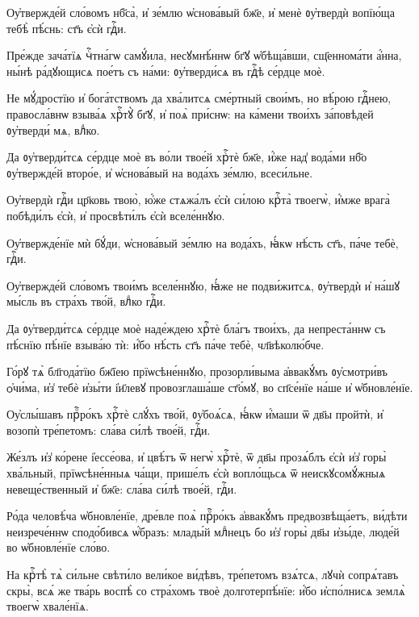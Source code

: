\hKv Оу҆твержде́й сло́вомъ нб҃са̀, и҆ зе́млю ѡ҆снова́вый бж҃е, и҆  менѐ ᲂу҆твердѝ вопїю́ща тебѣ̀ пѣ́снь: ст҃ъ є҆сѝ гдⷭ҇и.  

\hKv Пре́жде зача́тїѧ чⷭ҇тна́гѡ самꙋ́ила, несꙋмнѣ́ннѡ бг҃ꙋ  ѡ҆бѣща́вши, сщ҃еннома́ти а҆́нна, ны́нѣ ра́дꙋющисѧ пое́тъ съ на́ми:  ᲂу҆тверди́сѧ въ гдⷭ҇ѣ се́рдце моѐ. 

\hKv Не мꙋ́дростїю и҆ бога́тствомъ да хва́литсѧ сме́ртный свои́мъ, но  вѣ́рою гдⷭ҇нею, правосла́внѡ взыва́ѧ хрⷭ҇тꙋ̀ бг҃ꙋ, и҆ поѧ̀ при́снѡ:  на ка́мени твои́хъ за́повѣдей ᲂу҆тверди́ мѧ, влⷣко. 
%

\hKv Да ᲂу҆тверди́тсѧ се́рдце моѐ въ во́ли твое́й хрⷭ҇тѐ бж҃е,  и҆́же над̾ вода́ми нб҃о ᲂу҆твержде́й второ́е, и҆ ѡ҆снова́вый на  вода́хъ зе́млю, всеси́льне. 

\hKv Оу҆твердѝ гдⷭ҇и цр҃ковь твою̀, ю҆́же стѧжа́лъ є҆сѝ си́лою  крⷭ҇та̀ твоегѡ̀, и҆́мже врага̀ побѣди́лъ є҆сѝ, и҆ просвѣти́лъ  є҆сѝ вселе́ннꙋю. 

\hKv Оу҆твержде́нїе мѝ бꙋ́ди, ѡ҆снова́вый зе́млю на вода́хъ, ꙗ҆́кѡ  нѣ́сть ст҃ъ, па́че тебѐ, гдⷭ҇и. 

\hKv Оу҆твержде́й сло́вомъ твои́мъ вселе́ннꙋю, ꙗ҆́же не подви́житсѧ,  ᲂу҆твердѝ и҆ на́шꙋ мы́сль въ стра́хъ тво́й, влⷣко гдⷭ҇и.  

\hKv Да ᲂу҆тверди́тсѧ се́рдце моѐ наде́ждею хрⷭ҇тѐ бла́гъ твои́хъ,  да непреста́ннѡ съ пѣ́снїю пѣ́нїе взыва́ю тѝ: и҆́бо нѣ́сть ст҃ъ  па́че тебѐ, чл҃вѣколю́бче. 
%

\hKv Го́рꙋ тѧ̀ бл҃года́тїю бж҃їею прїѡсѣне́ннꙋю, прозорли́выма  а҆ввакꙋ́мъ ᲂу҆смотри́въ ѻ҆чи́ма, и҆з̾ тебѐ и҆зы́ти і҆и҃левꙋ  провозглаша́ше ст҃о́мꙋ, во сп҃се́нїе на́ше и҆ ѡ҆бновле́нїе. 

\hKv Оу҆слы́шавъ прⷪ҇ро́къ хрⷭ҇тѐ слꙋ́хъ тво́й, ᲂу҆боѧ́сѧ, ꙗ҆́кѡ  и҆́маши ѿ дв҃ы пройтѝ, и҆ возопѝ тре́петомъ: сла́ва си́лѣ  твое́й, гдⷭ҇и. 
%

\hKv Же́злъ и҆з̾ ко́рене і҆ессе́ова, и҆  цвѣ́тъ ѿ негѡ̀ хрⷭ҇тѐ, ѿ дв҃ы прозѧ́блъ є҆сѝ и҆з̾ горы̀  хва́льный, прїѡсѣне́нныѧ ча́щи, прише́лъ є҆сѝ вопло́щьсѧ ѿ  неискꙋсомꙋ́жныѧ невеще́ственный и҆ бж҃е: сла́ва си́лѣ твое́й, гдⷭ҇и.   

\hKv Ро́да человѣ́ча ѡ҆бновле́нїе, дре́вле поѧ̀ прⷪ҇ро́къ а҆ввакꙋ́мъ  предвозвѣща́етъ, ви́дѣти неизрече́ннѡ сподо́бивсѧ ѡ҆́бразъ: млады́й  млⷣнецъ бо и҆з̾ горы̀ дв҃ы и҆зы́де, люде́й во ѡ҆бновле́нїе сло́во. 
%

\hKv На крⷭ҇тѣ̀ тѧ̀ си́льне свѣти́ло вели́кое  ви́дѣвъ, тре́петомъ взѧ́тсѧ, лꙋчѝ сопрѧ́тавъ скры̀, всѧ́ же тва́рь  воспѣ̀ со стра́хомъ твоѐ долготерпѣ́нїе: и҆́бо и҆спо́лнисѧ землѧ̀  твоегѡ̀ хвале́нїѧ. 
%

